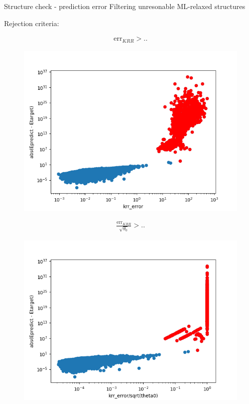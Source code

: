 \documentclass{beamer}
\begin{document}
\begin{frame}{Structure check - prediction error}
Filtering unresonable ML-relaxed structures

\bigskip

Rejection criteria:

\centering
\begin{minipage}{0.5\textwidth}
	\begin{align*}
	\text{err}_{KRR} > ..
	\end{align*}
	\begin{figure}
		\centering
		\includegraphics[width=\linewidth, trim={0 0 0 1.5cm}]{error_correlation}
		\caption*{}
	\end{figure}
\end{minipage}%
\begin{minipage}{0.5\textwidth}
	\begin{align*}
	\frac{\text{err}_{KRR}}{\sqrt{\theta_0}} > ..
	\end{align*}
	\begin{figure}
		\centering
		\includegraphics[width=\linewidth, trim={0 0 0 2.2cm}]{error_correlation_theta}
		\caption*{}
	\end{figure}
\end{minipage}
\end{frame}
\end{document}
